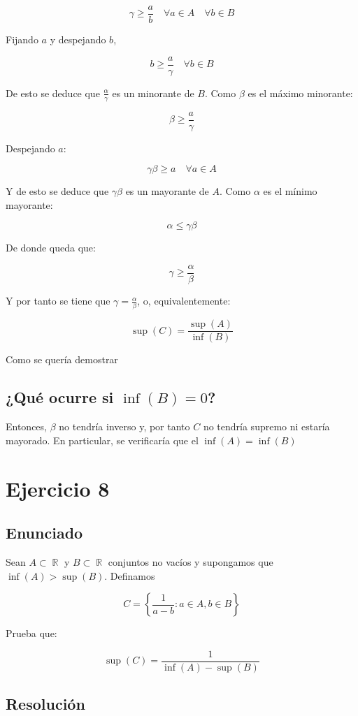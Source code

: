 \documentclass[11pt]{article}
\DeclareMathOperator{\R}{\mathbb{R}}
\begin{document}
\[
\gamma \geq \frac{a}{b} \quad \forall a \in A \quad \forall b \in B
\]

Fijando $a$ y despejando $b$,

\[
b \geq \frac{a}{\gamma} \quad \forall b \in B
\]

De esto se deduce que $\frac{\alpha}{\gamma}$ es un minorante de $B$. Como $\beta$
es el máximo minorante:

\[
\beta \geq \frac{a}{\gamma}
\]

Despejando $a$:

\[
\gamma \beta \geq a \quad \forall a \in A
\]

Y de esto se deduce que $\gamma\beta$ es un mayorante de $A$.
Como $\alpha$ es el mínimo mayorante:

\[
\alpha \leq \gamma \beta
\]

De donde queda que:

\[
\gamma \geq \frac{\alpha}{\beta}
\]

Y por tanto se tiene que $\gamma = \frac{\alpha}{\beta}$, o,
equivalentemente:

\[
\sup(C) = \frac{\sup(A)}{\inf(B)}
\]

Como se quería demostrar

\subsection{¿Qué ocurre si $\inf(B) = 0$?}
\label{sec-3-3}

Entonces, $\beta$ no tendría inverso y, por tanto $C$
no tendría supremo ni estaría mayorado. En particular, se
verificaría que el $\inf(A)=\inf(B)$

\section{Ejercicio 8}
\label{sec-4}
\subsection{Enunciado}
\label{sec-4-1}

Sean $A \subset \R$ y $B \subset \R$ conjuntos no vacíos
y supongamos que $\inf(A) > \sup(B)$. Definamos

\[
C = \left\{\frac{1}{a-b}: a \in A, b\in B\right\}
\]

Prueba que:

\[
\sup(C) = \frac{1}{\inf(A)-\sup(B)}
\]

\subsection{Resolución}
\label{sec-4-2}
\end{document}
